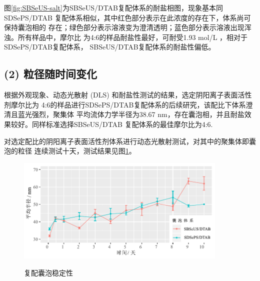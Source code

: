 \documentclass[bachelor,winfonts,replaceperiod]{jnuthesis}
\begin{document}
    图\ref{fig:SBSeUS-salt}为SBSeUS/DTAB复配体系的耐盐相图，现象基本同SDSePS/DTAB
    复配体系相似，其中红色部分表示在此浓度的存在下，体系尚可保持囊泡相的
    存在；绿色部分表示溶液变为澄清透明；蓝色部分表示溶液出现浑浊。所有样品中，摩尔比
    为4:6的样品耐盐性最好，可耐受1.93 mol/L ，相对于SDSePS/DTAB复配体系，
    SBSeUS/DTAB复配体系的耐盐性偏低。
    
    \subsection*{(2) 粒径随时间变化}
    根据外观现象、动态光散射 (DLS) 和耐盐性测试的结果，选定阴阳离子表面活性剂摩尔比为
    4:6的样品进行SDSePS/DTAB复配体系的后续研究，该配比下体系澄清且蓝光强烈，聚集体
    平均流体力学半径为38.67 nm，存在囊泡相，并且耐盐效果较好。同样标准选择SBSeUS/DTAB
    复配体系的最佳摩尔比为4:6.
    
    对选定配比的阴阳离子表面活性剂体系进行动态光散射测试，对其中的聚集体即囊泡的粒径
    连续测试十天，测试结果见图\ref{fig:vesicle-time-stability}。
    \begin{figure}[htbp]
        \centering
        \includegraphics[width=0.9\textwidth]{figure/vesicle-time-stability.pdf}\\
        \caption{复配囊泡稳定性}\label{fig:vesicle-time-stability}
    \end{figure}
\end{document}
